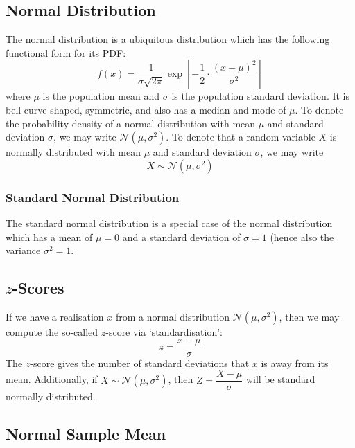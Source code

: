 \documentclass[11pt]{report} %
\begin{document}
\subsection{Normal Distribution}

The normal distribution is a ubiquitous distribution which has the following functional form for its PDF:
\begin{equation}
f\left(x\right) = \dfrac{1}{\sigma\sqrt{2\pi}}\exp\left[-\dfrac{1}{2}\cdot\dfrac{\left(x - \mu\right)^{2}}{\sigma^{2}}\right]
\end{equation}
where $\mu$ is the population mean and $\sigma$ is the population standard deviation. It is bell-curve shaped, symmetric, and also has a median and mode of $\mu$. To denote the probability density of a normal distribution with mean $\mu$ and standard deviation $\sigma$, we may write $\mathcal{N}\left(\mu, \sigma^{2}\right)$. To denote that a random variable $X$ is normally distributed with mean $\mu$ and standard deviation $\sigma$, we may write
\begin{equation}
X \sim \mathcal{N}\left(\mu, \sigma^{2}\right)
\end{equation}

\subsubsection{Standard Normal Distribution}

The standard normal distribution is a special case of the normal distribution which has a mean of $\mu = 0$ and a standard deviation of $\sigma = 1$ (hence also the variance $\sigma^{2} = 1$.

\subsection{$z$-Scores}

If we have a realisation $x$ from a normal distribution $\mathcal{N}\left(\mu, \sigma^{2}\right)$, then we may compute the so-called $z$-score via `standardisation':
\begin{equation}
z = \dfrac{x - \mu}{\sigma}
\end{equation}
The $z$-score gives the number of standard deviations that $x$ is away from its mean. Additionally, if $X \sim \mathcal{N}\left(\mu, \sigma^{2}\right)$, then $Z = \dfrac{X - \mu}{\sigma}$ will be standard normally distributed.

\subsection{Normal Sample Mean}
\end{document}
